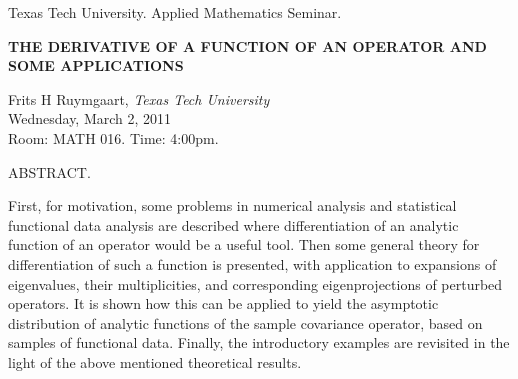 \documentclass[oneside]{amsart}
\newcommand{\talktitle}{The derivative of a function of an operator and some applications}
\newcommand{\talkspeaker}{ {\sc Frits H Ruymgaart}, \textit{Texas Tech University}}
\newcommand{\talkdate}{Wednesday, March 2, 2011}
\newcommand{\timelocation}{Room: MATH 016.  Time: 4:00pm.}
\newcommand{\talkabstract}{
First, for motivation, some problems in numerical analysis and statistical functional data analysis are described where differentiation of an analytic function of an operator would be a useful tool. Then some general theory for differentiation of such a function is presented, with application to expansions of eigenvalues, their multiplicities, and corresponding eigenprojections of perturbed operators. It is shown how this can be applied to yield the asymptotic distribution of analytic functions of the sample covariance operator, based on samples of functional data. Finally, the introductory examples are revisited in the light of the above mentioned theoretical results.
}
\begin{document}
\thispagestyle{empty}

\begin{center}
Texas Tech University.  Applied Mathematics Seminar.
\end{center}

\begin{center}

\textbf{\Huge {\uppercase{\talktitle}} }

{\Large
\talkspeaker\\
\talkdate\\
\timelocation
}
\end{center}

\vspace*{10pt}

{\Huge
ABSTRACT.
\talkabstract
}
\end{document}

